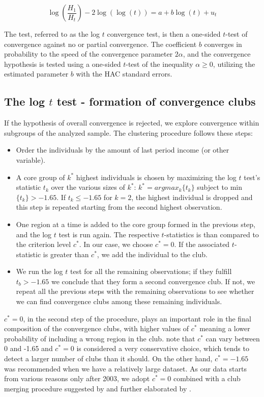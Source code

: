 \documentclass[11pt]{article}
\begin{document}
\begin{equation}\label{eq10}\log\left(\frac{H_1}{H_t}\right)-2\log(\log(t)) = a + b\log(t) + u_t\end{equation}

The test, referred to as the log \(t\) convergence test, is then a one-sided \(t\)-test of convergence against no or partial convergence. The coefficient \(b\) converges in probability to the speed of the convergence parameter \(2\alpha\), and the convergence hypothesis is tested using a one-sided \(t\)-test of the inequality \(\alpha \geq 0\), utilizing the estimated parameter \(b\) with the HAC standard errors.

\subsection{The log $t$ test - formation of convergence clubs }
If the hypothesis of overall convergence is rejected, we explore convergence within subgroups of the analyzed sample. The clustering procedure follows these steps:
\begin{itemize}
    \item Order the individuals by the amount of last period income (or other variable).
    \item  A core group of $k^{*}$ highest individuals is chosen by maximizing the log $t$ test's statistic $t_{k}$ over the various sizes of $k^{*}$:
    \(k^{*} = arg max_{k}\{t_{k}\}\) subject to min \( \{t_{k}\}> -1.65\). If \(t_{k} \leq -1.65 \) for \(k=2\), the highest individual is dropped and this step is repeated starting from the second highest observation. 
    \item One region at a time is added to the core group formed in the previous step, and the log $t$ test is run again. The respective  $t$-statistics is than compared to the criterion level $c^{*}$. In our case, we choose $c^{*}=0$. If the associated $t$-statistic is greater than  $c^{*}$, we add the individual to the club.
    \item We run the log $t$ test for all the remaining observations; if they fulfill \(t_b > -1.65\) we conclude that they form a second convergence club. If not, we repeat all the previous steps with the remaining observations to see whether we can find convergence clubs among these remaining individuals.
\end{itemize}    

 \(c^{*} = 0\), in the second step of the procedure, plays an important role in the final composition of the convergence clubs, with higher values of $c^*$ meaning a lower probability of including a wrong region in the club. \citet{phillips2009economic} note that $c^{*}$ can vary between 0 and -1.65 and $c^{*}=0$ is considered a very conservative choice, which tends to detect a larger number of clubs than it should. On the other hand, $c^{*}=-1.65$ was recommended when we have a relatively large dataset. As our data starts from various reasons only after 2003, we adopt $c^*= 0$ combined with a club merging procedure suggested by \citet{phillips2009economic} and further elaborated by \citet{bartkowska2012regional}. 
\end{document}
